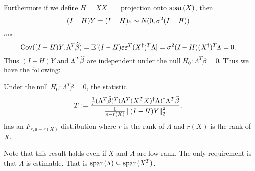 Furthermore if we define $H=XX^\dagger = $ projection onto $\operatorname{span}(X)$, then \[(I-H)Y = (I-H)\varepsilon \sim N(0,\sigma^2(I-H))\] and
\[\text{Cov}((I-H)Y,\Lambda^T\widehat{\beta}) = {\mathbb{E}}[(I-H)\varepsilon\varepsilon^T(X^\dagger)^T\Lambda] =\sigma^2(I-H)(X^\dagger)^T\Lambda = 0. \]
Thus $(I-H)Y$ and $\Lambda^T \widehat{\beta}$ are independent under the null $H_0 : \Lambda^T\beta = 0$. Thus we have the following:
\begin{prop}
    Under the null $H_0 : \Lambda^T \beta = 0$, the statistic 
    \begin{equation}\label{F-stat}
        T := \frac{\frac{1}{r}(\Lambda^T\widehat{\beta})^T(\Lambda^T (X^TX)^\dagger \Lambda)^\dagger \Lambda^T \widehat{\beta}}{\frac{1}{n-r(X)}\left\|(I-H)Y\right\|_2^2},
    \end{equation}
    has an $F_{r,n-r(X)}$ distribution where $r$ is the rank of $\Lambda$ and $r(X)$ is the rank of $X$.
\end{prop}
Note that this result holds even if $X$ and $\Lambda$ are low rank. The only requirement is that $\Lambda$ is estimable. That is $\operatorname{span}(\Lambda) \subseteq \operatorname{span}(X^T)$. 

